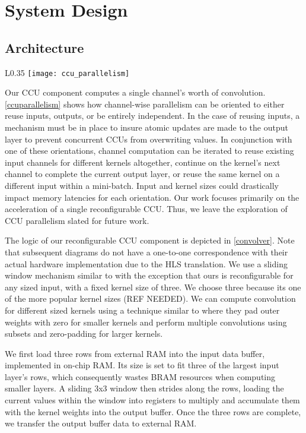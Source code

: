 \chapter{System Design}
\section{Architecture}

\begin{wrapfigure}{L}{0.35\textwidth}
	\texttt{[image: ccu\_parallelism]}
	\caption[CCU Channel-Wise Parallelism]%
	{\narrower Channel-wise convolution oriented to either reuse inputs, outputs, or stay independent.}
	\label{ccuparallelism}
\end{wrapfigure}

Our CCU component computes a single channel's worth of convolution. \ref{ccuparallelism} shows how channel-wise parallelism can be oriented to either reuse inputs, outputs, or be entirely independent. In the case of reusing inputs, a mechanism must be in place to insure atomic updates are made to the output layer to prevent concurrent CCUs from overwriting values. In conjunction with one of these orientations, channel computation can be iterated to reuse existing input channels for different kernels altogether, continue on the kernel's next channel to complete the current output layer, or reuse the same kernel on a different input within a mini-batch. Input and kernel sizes could drastically impact memory latencies for each orientation. Our work focuses primarily on the acceleration of a single reconfigurable CCU. Thus, we leave the exploration of CCU parallelism slated for future work.

The logic of our reconfigurable CCU component is depicted in \ref{convolver}. Note that subsequent diagrams do not have a one-to-one correspondence with their actual hardware implementation due to the HLS translation. We use a sliding window mechanism similar to \cite{liu2016automatic} with the exception that ours is reconfigurable for any sized input, with a fixed kernel size of three. We choose three because its one of the more popular kernel sizes (REF NEEDED). We can compute convolution for different sized kernels using a technique similar to \cite{guo2018angel} where they pad outer weights with zero for smaller kernels and perform multiple convolutions using subsets and zero-padding for larger kernels.

We first load three rows from external RAM into the input data buffer, implemented in on-chip RAM. Its size is set to fit three of the largest input layer's rows, which consequently wastes BRAM resources when computing smaller layers. A sliding 3x3 window then strides along the rows, loading the current values within the window into registers to multiply and accumulate them with the kernel weights into the output buffer. Once the three rows are complete, we transfer the output buffer data to external RAM.


